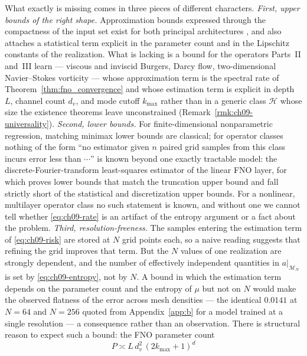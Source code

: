 What exactly is missing comes in three pieces of different characters. \emph{First, upper bounds of the right shape.}
Approximation bounds expressed through the compactness of the input set exist for
both principal architectures \cite{kovachki2021universal,lanthaler2022error}, and
\cite{lanthaler2022error} also attaches a statistical term explicit in the
parameter count and in the Lipschitz constants of the realization. What is
lacking is a bound for the operators Parts~II and~III learn ---
viscous and inviscid Burgers, Darcy flow, two-dimensional Navier--Stokes
vorticity --- whose approximation term is the spectral rate of
Theorem~\ref{thm:fno_convergence} and whose estimation term is explicit in depth
$L$, channel count $d_v$, and mode cutoff $k_{\max}$ rather than in a generic
class $\mathcal{H}$ whose size the existence theorems leave unconstrained
(Remark~\ref{rmk:ch09-universality}). \emph{Second, lower bounds.} For finite-dimensional
nonparametric regression, matching minimax lower bounds are classical; for
operator classes nothing of the form ``no estimator given $n$ paired grid
samples from this class incurs error less than $\cdots$'' is known beyond one
exactly tractable model: the discrete-Fourier-transform least-squares estimator
of the linear FNO layer, for which \cite{subedi2024controlling} proves lower
bounds that match the truncation upper bound and fall strictly short of the
statistical and discretization upper bounds. For a nonlinear, multilayer
operator class no such statement is known, and without one we cannot tell
whether \eqref{eq:ch09-rate} is an artifact of the entropy
argument or a fact about the problem. \emph{Third, resolution-freeness.} The samples
entering the estimation term of \eqref{eq:ch09-risk} are stored at $N$ grid
points each, so a
naive reading suggests that refining the grid improves that term. But
the $N$ values of one realization are strongly dependent, and the number of
effectively independent quantities in $a|_{\mathcal{M}_N}$ is set by
\eqref{eq:ch09-entropy}, not by $N$. A bound in which the estimation term
depends on the parameter count and the entropy of $\mu$ but not on $N$ would
make the observed flatness of the error across mesh densities --- the identical
$0.0141$ at $N=64$ and $N=256$ quoted from Appendix~\ref{app:b} for a model trained
at a single resolution --- a
consequence rather than an observation.
There is structural reason to expect such a bound: the FNO parameter count
\begin{equation}
  P \asymp L\,d_v^{2}\,(2k_{\max}+1)^{d}
  \label{eq:ch09-paramcount}
\end{equation}
